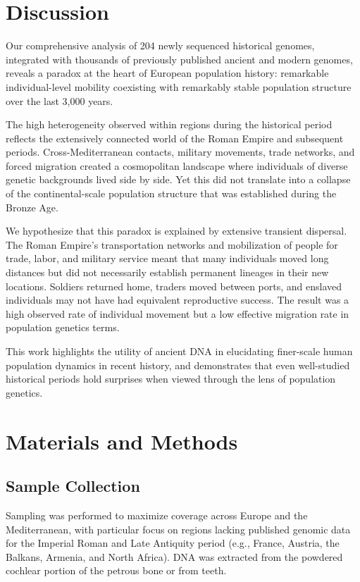 \documentclass[11pt]{article}
\begin{document}
\section{Discussion}

Our comprehensive analysis of 204 newly sequenced historical genomes, integrated with thousands of previously published ancient and modern genomes, reveals a paradox at the heart of European population history: remarkable individual-level mobility coexisting with remarkably stable population structure over the last 3,000 years.

The high heterogeneity observed within regions during the historical period reflects the extensively connected world of the Roman Empire and subsequent periods. Cross-Mediterranean contacts, military movements, trade networks, and forced migration created a cosmopolitan landscape where individuals of diverse genetic backgrounds lived side by side. Yet this did not translate into a collapse of the continental-scale population structure that was established during the Bronze Age.

We hypothesize that this paradox is explained by extensive transient dispersal. The Roman Empire's transportation networks and mobilization of people for trade, labor, and military service meant that many individuals moved long distances but did not necessarily establish permanent lineages in their new locations. Soldiers returned home, traders moved between ports, and enslaved individuals may not have had equivalent reproductive success. The result was a high observed rate of individual movement but a low effective migration rate in population genetics terms.

This work highlights the utility of ancient DNA in elucidating finer-scale human population dynamics in recent history, and demonstrates that even well-studied historical periods hold surprises when viewed through the lens of population genetics.

\section{Materials and Methods}

\subsection{Sample Collection}

Sampling was performed to maximize coverage across Europe and the Mediterranean, with particular focus on regions lacking published genomic data for the Imperial Roman and Late Antiquity period (e.g., France, Austria, the Balkans, Armenia, and North Africa). DNA was extracted from the powdered cochlear portion of the petrous bone or from teeth.
\end{document}

